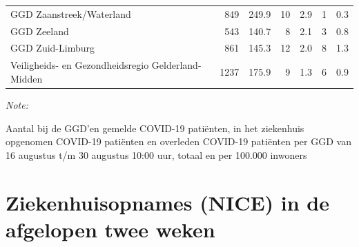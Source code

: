 \documentclass[
  english,
  man,floatsintext]{apa6}
\begin{document}
\begin{table}
\begin{threeparttable}
\begin{tabular}{lrrrrrr}
GGD Zaanstreek/Waterland & 849 & 249.9 & 10 & 2.9 & 1 & 0.3\\
GGD Zeeland & 543 & 140.7 & 8 & 2.1 & 3 & 0.8\\
GGD Zuid-Limburg & 861 & 145.3 & 12 & 2.0 & 8 & 1.3\\
Veiligheids- en Gezondheidsregio Gelderland-Midden & 1237 & 175.9 & 9 & 1.3 & 6 & 0.9\\
\bottomrule
\end{tabular}
\begin{tablenotes}
\item \textit{Note: } 
\item Aantal bij de GGD’en gemelde COVID-19 patiënten, in het ziekenhuis opgenomen COVID-19 patiënten en overleden COVID-19 patiënten per GGD van 16 augustus t/m 30 augustus 10:00 uur, totaal en per 100.000 inwoners
\end{tablenotes}
\end{threeparttable}
\endgroup{}
\end{table}

\newpage

\hypertarget{ziekenhuisopnames-nice-in-de-afgelopen-twee-weken}{%
\section{Ziekenhuisopnames (NICE) in de afgelopen twee weken}\label{ziekenhuisopnames-nice-in-de-afgelopen-twee-weken}}
\end{document}
